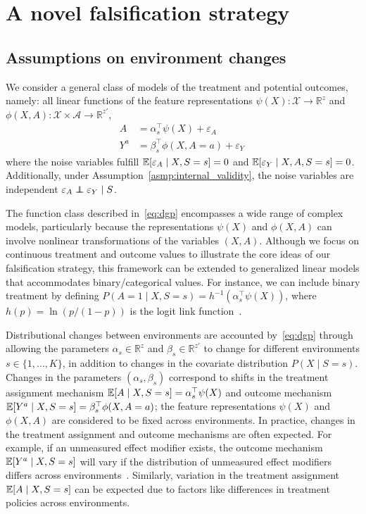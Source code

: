 \documentclass{article}
\begin{document}
\section{A novel falsification strategy}


\subsection{Assumptions on environment changes}

We consider a general class of models of the treatment and potential outcomes, namely: all linear functions of the feature representations $\psi(X) : \mathcal{X} \rightarrow \mathbb{R}^{z}$ and $\phi(X,A) : \mathcal{X} \times \mathcal{A} \rightarrow \mathbb{R}^{z'}$,
\begin{equation} \label{eq:dgp}
    \begin{aligned}
        A &= \alpha_{s}^\top \psi(X) + \varepsilon_A\\
        Y^{a} &= \beta_{s}^\top \phi(X,A=a) + \varepsilon_Y~
    \end{aligned}
\end{equation}
where the noise variables fulfill $\mathbb{E}[\varepsilon_A \mid X, S=s]=0$ and $\mathbb{E}[\varepsilon_Y \mid X,A, S=s]=0$. Additionally, under Assumption~\ref*{asmp:internal_validity}, the noise variables are independent $\varepsilon_A\indep \varepsilon_Y \mid S$. 

The function class described in~\eqref{eq:dgp} encompasses a wide range of complex models, particularly because the representations $\psi(X)$ and $\phi(X,A)$ can involve nonlinear transformations of the variables $(X, A)$. Although we focus on continuous treatment and outcome values to illustrate the core ideas of our falsification strategy, this framework can be extended to generalized linear models that accommodates binary/categorical values. For instance, we can include binary treatment by defining $P(A=1 \mid X, S=s) = h^{-1}(\alpha_s^\top \psi(X))$, where $h(p) = \ln(p / (1 - p))$ is the logit link function~\citep{mccullagh1989generalized}. 


Distributional changes between environments are accounted by~\eqref{eq:dgp} through allowing 
the parameters $\alpha_{s}\in\mathbb{R}^{z}$ and $\beta_{s}\in\mathbb{R}^{z'}$ to change for different environments $s\in\{1,\dots,K\}$, in addition to changes in the covariate distribution $P(X\mid S=s)$. Changes in the parameters $(\alpha_s,\beta_s)$ correspond to shifts in the treatment assignment mechanism $\mathbb{E}[A\mid X, S=s] = \alpha_{s}^\top \psi(X)$ and outcome mechanism $\mathbb{E}[Y^a\mid X, S=s]=\beta_{s}^\top \phi(X,A=a)$; the feature representations $\psi(X)$ and $\phi(X,A)$ are considered to be fixed across environments. In practice, changes in the treatment assignment and outcome mechanisms are often expected. For example, if an unmeasured effect modifier exists, the outcome mechanism $\mathbb{E}[Y^a \mid X, S = s]$ will vary if the distribution of unmeasured effect modifiers differs across environments~\citep{dahabreh2020extending}. Similarly, variation in the treatment assignment $\mathbb{E}[A \mid X, S = s]$ can be expected due to factors like differences in treatment policies across environments.
\end{document}
